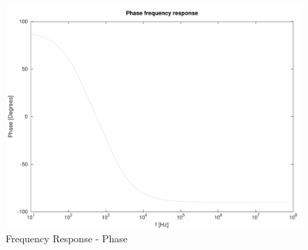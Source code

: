 \begin{figure}[H] \centering
\includegraphics[width=0.7\linewidth]{../mat/fresponse2.pdf}
\caption{Frequency Response - Phase}
\label{fig:fresponse2}
\end{figure}